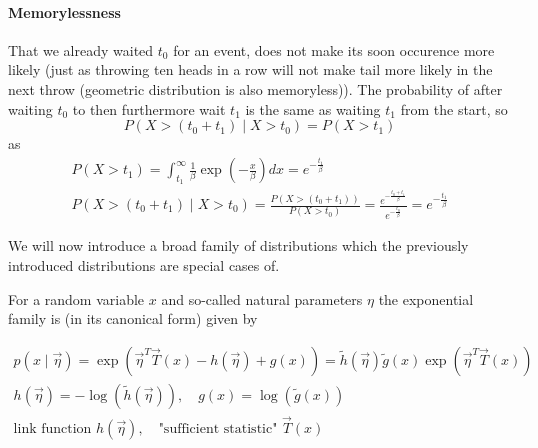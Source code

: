\paragraph*{Memorylessness} That we already waited $t_0$ for an event, does not make
its soon occurence more likely (just as throwing ten heads in a row
will not make tail more likely in the next throw (geometric distribution is also
memoryless)). The probability of after waiting $t_0$ to then furthermore wait $t_1$ is
the same as waiting $t_1$ from the start, so
\begin{equation}
    P(X > (t_0 + t_1) \mid X > t_0) = P(X > t_1)
\end{equation}
as
\begin{equation}
    \begin{gathered}
    P\left(X>t_1\right)=\int_{t_1}^{\infty} \frac{1}{\beta} \exp \left(-\frac{x}{\beta}\right) d x=e^{-\frac{t_1}{\beta}} \\
    P\left(X>\left(t_0+t_1\right) \mid X>t_0\right)=\frac{P\left(X>\left(t_0+t_1\right)\right)}{P\left(X>t_0\right)}=\frac{e^{-\frac{t_0+t_1}{\beta}}}{e^{-\frac{t_0}{\beta}}}=e^{-\frac{t_1}{\beta}}
    \end{gathered}
\end{equation}

We will now introduce a broad family of distributions which the previously
introduced distributions are special cases of.

For a random variable $x$ and so-called natural parameters $\eta$ the exponential family
is (in its canonical form) given by

\begin{equation}
    \begin{gathered}
    p(x \mid \vec{\eta})=\exp \left(\vec{\eta}^T \vec{T}(x)-h(\vec{\eta})+g(x)\right)=\tilde{h}(\vec{\eta}) \tilde{g}(x) \exp \left(\vec{\eta}^T \vec{T}(x)\right) \\
    h(\vec{\eta})=-\log (\tilde{h}(\vec{\eta})), \quad g(x)=\log (\tilde{g}(x)) \\
    \text{link function } h(\vec{\eta}), \quad \text{"sufficient statistic" } \vec{T}(x)
    \end{gathered}
\end{equation}

